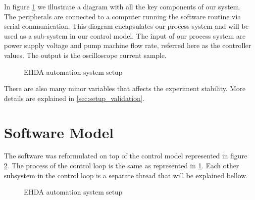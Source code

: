 In figure \ref{fig:setup} we illustrate a diagram with all the key components of our system. The peripherals are connected to a computer running the software routine via serial communication. 
This diagram encapsulates our process system and will be used as a sub-system in our control model. The input of our process system are power supply voltage and pump machine flow rate, referred here as the controller values. The output is the oscilloscope current sample.

\begin{figure}[H]
  \centering
  \caption{EHDA automation system setup}
  \label{fig:setup}
\end{figure}

There are also many minor variables that affects the experiment stability. More details are explained in \ref{sec:setup_validation}.


\section{Software Model}
\label{sec:control_model}

The software was reformulated on top of the control model represented in figure \ref{fig:control_model_fig}. The process of the control loop is the same as represented in \ref{fig:setup}. 
Each other subsystem in the control loop is a separate thread that will be explained bellow.

\begin{figure}[H]
  \centering
  \caption{EHDA automation system setup}
  \label{fig:control_model_fig}
\end{figure}

